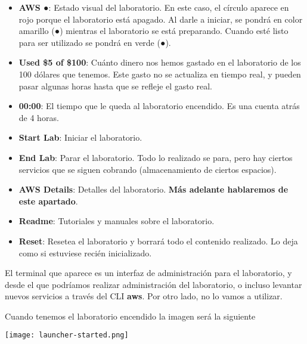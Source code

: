 \begin{itemize}
	\item \textbf{AWS \color{red}●}: Estado visual del laboratorio. En este caso, el círculo aparece en rojo porque el laboratorio está apagado. Al darle a iniciar, se pondrá en color amarillo ({\color{yellow}●}) mientras el laboratorio se está preparando. Cuando esté listo para ser utilizado se pondrá en verde ({\color{green}●}).
	
	\item \textbf{Used \$5 of \$100}: Cuánto dinero nos hemos gastado en el laboratorio de los 100 dólares que tenemos. Este gasto no se actualiza en tiempo real, y pueden pasar algunas horas hasta que se refleje el gasto real.
	
	\item \textbf{00:00}: El tiempo que le queda al laboratorio encendido. Es una cuenta atrás de 4 horas. 
	
	\item \faPlay  \textbf{ Start Lab}: Iniciar el laboratorio.
	
	\item \faStop  \textbf{ End Lab}: Parar el laboratorio. Todo lo realizado se para, pero hay ciertos servicios que se siguen cobrando (almacenamiento de ciertos espacios).
	
	\item \faInfo  \textbf{ AWS Details}: Detalles del laboratorio. \textbf{Más adelante hablaremos de este apartado}.
	
	\item \faInfo  \textbf{ Readme}: Tutoriales y manuales sobre el laboratorio.
	
	\item \faUndo \textbf{ Reset}: Resetea el laboratorio y borrará todo el contenido realizado. Lo deja como si estuviese recién inicializado.
\end{itemize}

El terminal que aparece es un interfaz de administración para el laboratorio, y desde el que podríamos realizar administración del laboratorio, o incluso levantar nuevos servicios a través del CLI \textbf{aws}. Por otro lado, no lo vamos a utilizar.


Cuando tenemos el laboratorio encendido la imagen será la siguiente

\begin{center}
	\texttt{[image: launcher-started.png]}
\end{center}

